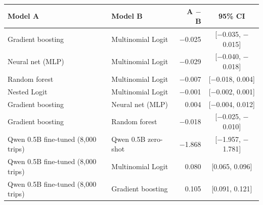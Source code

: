 \begin{tabular}{llrc}
\toprule
Model A & Model B & A $-$ B & 95\% CI \\
\midrule
Gradient boosting & Multinomial Logit & $-$0.025 & [$-$0.035, $-$0.015] \\
Neural net (MLP) & Multinomial Logit & $-$0.029 & [$-$0.040, $-$0.018] \\
Random forest & Multinomial Logit & $-$0.007 & [$-$0.018, 0.004] \\
Nested Logit & Multinomial Logit & $-$0.001 & [$-$0.002, 0.001] \\
Gradient boosting & Neural net (MLP) & 0.004 & [$-$0.004, 0.012] \\
Gradient boosting & Random forest & $-$0.018 & [$-$0.025, $-$0.010] \\
Qwen 0.5B fine-tuned (8,000 trips) & Qwen 0.5B zero-shot & $-$1.868 & [$-$1.957, $-$1.781] \\
Qwen 0.5B fine-tuned (8,000 trips) & Multinomial Logit & 0.080 & [0.065, 0.096] \\
Qwen 0.5B fine-tuned (8,000 trips) & Gradient boosting & 0.105 & [0.091, 0.121] \\
\bottomrule
\end{tabular}
